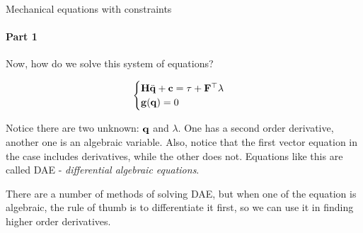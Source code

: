 \documentclass{beamer}
\begin{document}
\begin{frame}{Mechanical equations with constraints}
\framesubtitle{Part 1}
\begin{flushleft}

Now, how do we solve this system of equations?

\begin{equation}
\begin{cases}
    \mathbf{H} \ddot{\mathbf{q}} + \mathbf{c} = \tau + \mathbf{F}^\top \lambda \\
    \mathbf{g}(\mathbf{q}) = 0
\end{cases}
\end{equation}

Notice there are two unknown: $\mathbf{q}$ and $\lambda$. One has a second order derivative, another one is an algebraic variable. Also, notice that the first vector equation in the case includes derivatives, while the other does not. Equations like this are called DAE - \emph{differential algebraic equations}.

\bigskip

There are a number of methods of solving DAE, but when one of the equation is algebraic, the rule of thumb is to differentiate it first, so we can use it in finding higher order derivatives.

\end{flushleft}
\end{frame}
\end{document}
